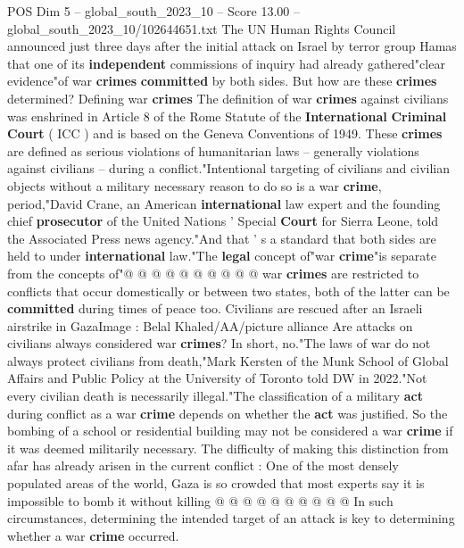 \begin{textsample}{POS Dim 5 – global\_south\_2023\_10 – Score 13.00 – global\_south\_2023\_10/102644651.txt}  \label{ex:f5_pos_387}
The UN Human Rights Council announced just three days after the initial attack on Israel by terror group Hamas that one of its \textbf{independent} commissions of inquiry had already gathered"clear evidence"of war \textbf{crimes} \textbf{committed} by both sides.
But how are these \textbf{crimes} determined?
Defining war \textbf{crimes} The definition of war \textbf{crimes} against civilians was enshrined in Article 8 of the Rome Statute of the \textbf{International} \textbf{Criminal} \textbf{Court} ( ICC ) and is based on the Geneva Conventions of 1949.
These \textbf{crimes} are defined as serious violations of humanitarian laws -- generally violations against civilians -- during a conflict."Intentional targeting of civilians and civilian objects without a military necessary reason to do so is a war \textbf{crime}, period,"David Crane, an American \textbf{international} law expert and the founding chief \textbf{prosecutor} of the United Nations ' Special \textbf{Court} for Sierra Leone, told the Associated Press news agency."And that ' s a standard that both sides are held to under \textbf{international} law."The \textbf{legal} concept of"war \textbf{crime}"is separate from the concepts of"@ @ @ @ @ @ @ @ @ @ war \textbf{crimes} are restricted to conflicts that occur domestically or between two states, both of the latter can be \textbf{committed} during times of peace too.
Civilians are rescued after an Israeli airstrike in GazaImage : Belal Khaled/AA/picture alliance Are attacks on civilians always considered war \textbf{crimes}?
In short, no."The laws of war do not always protect civilians from death,"Mark Kersten of the Munk School of Global Affairs and Public Policy at the University of Toronto told DW in 2022."Not every civilian death is necessarily illegal."The classification of a military \textbf{act} during conflict as a war \textbf{crime} depends on whether the \textbf{act} was justified.
So the bombing of a school or residential building may not be considered a war \textbf{crime} if it was deemed militarily necessary.
The difficulty of making this distinction from afar has already arisen in the current conflict : One of the most densely populated areas of the world, Gaza is so crowded that most experts say it is impossible to bomb it without killing @ @ @ @ @ @ @ @ @ @ In such circumstances, determining the intended target of an attack is key to determining whether a war \textbf{crime} occurred.

\end{textsample}
